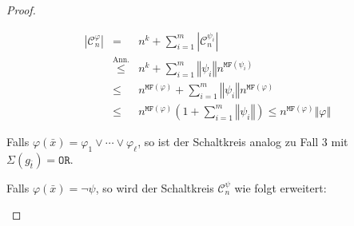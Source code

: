 \begin{proof}
\begin{casenv}
\begin{description}
\begin{eqnarray*}
\left|\mathcal{C}_{n}^{\varphi}\right| & = & n^{k}+\sum_{i=1}^{m}\left|\mathcal{C}_{n}^{\psi_{i}}\right|\\
 & \overset{\mathrm{Ann.}}{\leqslant} & n^{k}+\sum_{i=1}^{m}\left\Vert \psi_{i}\right\Vert n^{\mathtt{MF}\left(\psi_{i}\right)}\\
 & \leqslant & n^{\mathtt{MF}\left(\varphi\right)}+\sum_{i=1}^{m}\left\Vert \psi_{i}\right\Vert n^{\mathtt{MF}\left(\varphi\right)}\\
 & \leqslant & n^{\mathtt{MF}\left(\varphi\right)}\left(1+\sum_{i=1}^{m}\left\Vert \psi_{i}\right\Vert \right)\leqslant n^{\mathtt{MF}\left(\varphi\right)}\left\Vert \varphi\right\Vert 
\end{eqnarray*}
\end{description}
\item Falls $\varphi\left(\bar{x}\right)=\varphi_{1}\vee\cdots\vee\varphi_{\ell}$,
so ist der Schaltkreis analog zu Fall 3 mit $\Sigma\left(g_{\bar{t}}\right)=\mathtt{OR}$.
\item Falls $\varphi\left(\bar{x}\right)=\neg\psi$, so wird der Schaltkreis
$\mathcal{C}_{n}^{\psi}$ wie folgt erweitert:


\end{casenv}
\end{proof}
